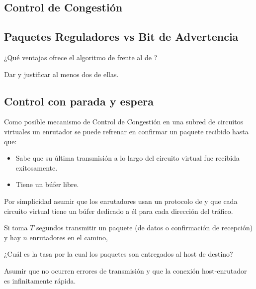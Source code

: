 \documentclass[12pt]{report}
\begin{document}
\begin{exer}
	\section{Control de Congestión}
	\subsection{Paquetes Reguladores vs Bit de Advertencia \stwo \steo}
	¿Qué ventajas ofrece el algoritmo de  frente al de ?

	Dar y justificar al menos dos de ellas.
\end{exer}

\begin{exer}
	\subsection{Control con parada y espera \sthree}
	Como posible mecanismo de Control de Congestión en una subred de circuitos virtuales
	un enrutador se puede refrenar en confirmar un paquete recibido hasta que:

	\begin{itemize}
		\item Sabe que su última transmisión a lo largo del circuito virtual fue recibida exitosamente.
		\item Tiene un búfer libre.
	\end{itemize}

	Por simplicidad asumir que los enrutadores usan un protocolo de  y que cada
	circuito virtual tiene un búfer dedicado a él para cada dirección del tráfico.

	Si toma $T$ segundos transmitir un paquete (de datos o confirmación de recepción) y hay $n$ enrutadores en el camino,

	¿Cuál es la tasa por la cual los paquetes son entregados al host de destino?

	Asumir que no ocurren errores de transmisión y que la conexión host-enrutador es infinitamente rápida.
\end{exer}
\end{document}
